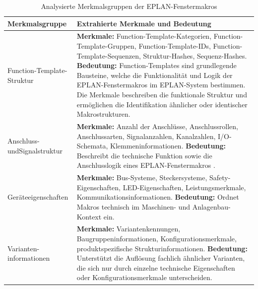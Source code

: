 \begin{table}[htbp]
    \centering
    \setlength{\tabcolsep}{4pt}
    \renewcommand{\arraystretch}{1.08}
    \caption{Analysierte Merkmalsgruppen der EPLAN-Fenstermakros}
    \label{tab:makrostrukturmerkmale}
    \begin{tabularx}{\textwidth}{>{\raggedright\arraybackslash}p{4.0cm} >{\raggedright\arraybackslash}X}
        \toprule
        \textbf{Merkmalsgruppe} & \textbf{Extrahierte Merkmale und Bedeutung} \\
        \midrule
        Function-Template-\newline Struktur &
        \textbf{Merkmale:} Function-Template-Kategorien, Function-Template-Gruppen, Function-Template-IDs, Function-Template-Sequenzen, Struktur-Hashes, Sequenz-Hashes.\newline
        \textbf{Bedeutung:} Function-Templates sind grundlegende Bausteine, welche die Funktionalität und Logik der EPLAN-Fenstermakros \cite{EPLAN-Makros} im EPLAN-System \cite{eplan2026} bestimmen. Die Merkmale beschreiben die funktionale Struktur und ermöglichen die Identifikation ähnlicher oder identischer Makrostrukturen. \\
        \addlinespace
        Anschluss- und\newline Signalstruktur &
        \textbf{Merkmale:} Anzahl der Anschlüsse, Anschlussrollen, Anschlussarten, Signalanzahlen, Kanalzahlen, I/O-Schemata, Klemmeninformationen.\newline
        \textbf{Bedeutung:} Beschreibt die technische Funktion sowie die Anschlusslogik eines EPLAN-Fenstermakros \cite{EPLAN-Makros}. \\
        \addlinespace
        Geräteeigenschaften &
        \textbf{Merkmale:} Bus-Systeme, Steckersysteme, Safety-Eigenschaften, LED-Eigenschaften, Leistungsmerkmale, Kommunikationsinformationen.\newline
        \textbf{Bedeutung:} Ordnet Makros technisch im Maschinen- und Anlagenbau-Kontext ein. \\
        \addlinespace
        Varianten-\newline informationen &
        \textbf{Merkmale:} Variantenkennungen, Baugruppeninformationen, Konfigurationsmerkmale, produktspezifische Strukturinformationen.\newline
        \textbf{Bedeutung:} Unterstützt die Auflösung fachlich ähnlicher Varianten, die sich nur durch einzelne technische Eigenschaften oder Konfigurationsmerkmale unterscheiden. \\
        \bottomrule
    \end{tabularx}
\end{table}

